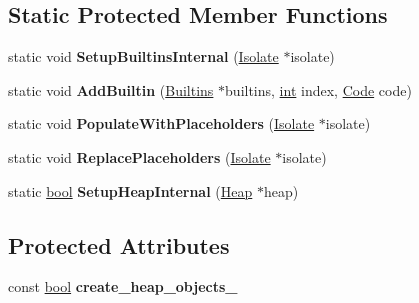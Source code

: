 \subsection*{Static Protected Member Functions}
\begin{DoxyCompactItemize}
\item 
\mbox{\label{classv8_1_1internal_1_1SetupIsolateDelegate_a2b2aa0e991a82f050d385b22b2956628}} 
static void {\bfseries Setup\+Builtins\+Internal} (\mbox{\hyperlink{classv8_1_1internal_1_1Isolate}{Isolate}} $\ast$isolate)
\item 
\mbox{\label{classv8_1_1internal_1_1SetupIsolateDelegate_ac259c0c5a9f17e19d5f3bccad7fc8cd1}} 
static void {\bfseries Add\+Builtin} (\mbox{\hyperlink{classv8_1_1internal_1_1Builtins}{Builtins}} $\ast$builtins, \mbox{\hyperlink{classint}{int}} index, \mbox{\hyperlink{classv8_1_1internal_1_1Code}{Code}} code)
\item 
\mbox{\label{classv8_1_1internal_1_1SetupIsolateDelegate_ac0b8187e4aceaf463aae980491056a26}} 
static void {\bfseries Populate\+With\+Placeholders} (\mbox{\hyperlink{classv8_1_1internal_1_1Isolate}{Isolate}} $\ast$isolate)
\item 
\mbox{\label{classv8_1_1internal_1_1SetupIsolateDelegate_a4a1bc19d1fd3b13033b9d8f3c6221bee}} 
static void {\bfseries Replace\+Placeholders} (\mbox{\hyperlink{classv8_1_1internal_1_1Isolate}{Isolate}} $\ast$isolate)
\item 
\mbox{\label{classv8_1_1internal_1_1SetupIsolateDelegate_ad6119f61fefeeb80082596814e0ccc4d}} 
static \mbox{\hyperlink{classbool}{bool}} {\bfseries Setup\+Heap\+Internal} (\mbox{\hyperlink{classv8_1_1internal_1_1Heap}{Heap}} $\ast$heap)
\end{DoxyCompactItemize}
\subsection*{Protected Attributes}
\begin{DoxyCompactItemize}
\item 
\mbox{\label{classv8_1_1internal_1_1SetupIsolateDelegate_ae7f808e542333d18a9fd81a4a1fd692e}} 
const \mbox{\hyperlink{classbool}{bool}} {\bfseries create\+\_\+heap\+\_\+objects\+\_\+}
\end{DoxyCompactItemize}


